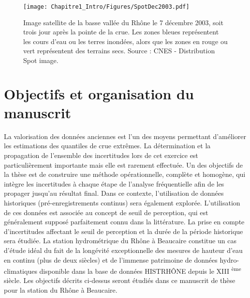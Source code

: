 \begin{figure}[h]
	\centering
	\texttt{[image: Chapitre1\_Intro/Figures/SpotDec2003.pdf]}	
	\caption{Image satellite de la basse vallée du Rhône le 7 décembre 2003, soit trois jour après la pointe de la crue. Les zones bleues représentent les cours d'eau ou les terres inondées, alors que les zones en rouge ou vert représentent des terrains secs. Source : CNES - Distribution Spot image.}
	\label{fig:Spot}
\end{figure}

\FloatBarrier
	\section*{Objectifs et organisation du manuscrit}
%

	\paragraph{} La valorisation des données anciennes est l'un des moyens permettant d'améliorer les estimations des quantiles de crue extrêmes. La détermination et la propagation de l'ensemble des incertitudes lors de cet exercice est particulièrement importante mais elle est rarement effectuée. Un des objectifs de la thèse est de construire une méthode opérationnelle, complète et homogène, qui intègre les incertitudes à chaque étape de l'analyse fréquentielle afin de les propager jusqu'au résultat final. Dans ce contexte, l'utilisation de données historiques (pré-enregistrements continus) sera également explorée. L'utilisation de ces données est associée au concept de seuil de perception, qui est généralement supposé parfaitement connu dans la littérature. La prise en compte d'incertitudes affectant le seuil de perception et la durée de la période historique sera étudiée. La station hydrométrique du Rhône à Beaucaire constitue un cas d'étude idéal du fait de la longévité exceptionnelle des mesures de hauteur d'eau en continu (plus de deux siècles) et de l'immense patrimoine de données hydro-climatiques disponible dans la base de données HISTRHÔNE depuis le XIII \textsuperscript{ème} siècle. Les objectifs décrits ci-dessus seront étudiés dans ce manuscrit de thèse pour la station du Rhône à Beaucaire.
	
